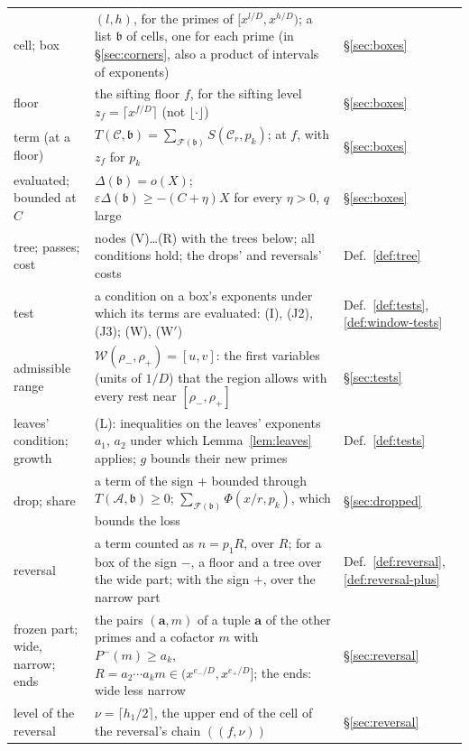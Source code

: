 \documentclass[11pt]{article}
\theoremstyle{definition}
\begin{document}
{\begin{longtable}{@{}>{\raggedright\arraybackslash}p{}
  >{\raggedright\arraybackslash}p{}
  >{\raggedright\arraybackslash}p{}@{}}
cell; box & $(l, h)$, for the primes of $[x^{l/D}, x^{h/D})$; a list $\mathfrak b$ of cells, one for each prime (in
  \S\ref{sec:corners}, also a product of intervals of exponents) & \S\ref{sec:boxes} \\
floor & the sifting floor $f$, for the sifting level $z_f = \lceil x^{f/D} \rceil$ (not $\lfloor \cdot \rfloor$) &
  \S\ref{sec:boxes} \\
term (at a floor) & $T(\mathcal C, \mathfrak b) = \sum_{\mathcal F(\mathfrak b)} S(\mathcal C_r, p_k)$; at $f$, with
  $z_f$ for $p_k$ & \S\ref{sec:boxes} \\
evaluated; bounded at $C$ & $\Delta(\mathfrak b) = o(X)$; $\varepsilon\Delta(\mathfrak b) \ge -(C + \eta)X$ for every
  $\eta > 0$, $q$ large & \S\ref{sec:boxes} \\
tree; passes; cost & nodes (V)\ldots(R) with the trees below; all conditions hold; the drops' and reversals' costs &
  Def.~\ref{def:tree} \\
test & a condition on a box's exponents under which its terms are evaluated: (I), (J2), (J3); (W), (W$'$) &
  Def.~\ref{def:tests}, \ref{def:window-tests} \\
admissible range & $\mathcal W(\rho_-, \rho_+) = [u, v]$: the first variables (units of $1/D$) that the region allows
  with every rest near $[\rho_-, \rho_+]$ &
  \S\ref{sec:tests} \\
leaves' condition; growth & (L): inequalities on the leaves' exponents $a_1$, $a_2$ under which
  Lemma~\ref{lem:leaves} applies; $g$ bounds
  their new primes & Def.~\ref{def:tests} \\
drop; share & a term of the sign $+$ bounded through $T(\mathcal A, \mathfrak b) \ge 0$; $\sum_{\mathcal F(\mathfrak
  b)} \Phi(x/r,
  p_k)$, which bounds the loss & \S\ref{sec:dropped} \\
reversal & a term counted as $n = p_1 R$, over $R$; for a box of the sign $-$, a floor and a tree over the wide part;
  with the sign $+$, over the narrow part & Def.~\ref{def:reversal}, \ref{def:reversal-plus} \\
frozen part; wide, narrow; ends & the pairs $(\mathbf a, m)$ of a tuple $\mathbf a$ of the other primes and a cofactor
  $m$ with $P^-(m) \ge a_k$, $R = a_2 \cdots a_k m \in (x^{e_-/D}, x^{e_+/D}]$; the ends: wide less narrow &
  \S\ref{sec:reversal} \\
level of the reversal & $\nu = \lceil h_1/2 \rceil$, the upper end of the cell of the reversal's chain $((f, \nu))$ &
  \S\ref{sec:reversal} \\

\end{longtable}}
\end{document}
